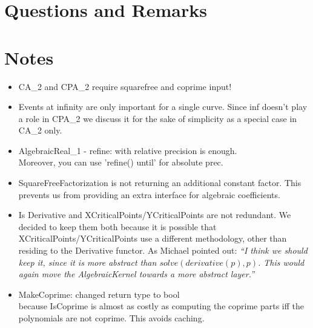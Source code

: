 
\section{Questions and Remarks}

\section{Notes}
\begin{itemize}
 \item CA\_2 and CPA\_2 require squarefree and coprime input! 
 \item Events at infinity are only important for a single curve. Since
   inf doesn't play a role in CPA\_2 we discuss it for the sake of
   simplicity as a special case in CA\_2 only. 
\item AlgebraicReal\_1 - refine: with relative precision is enough. \\
      Moreover, you can use 'refine() until' for absolute prec.
\item SquareFreeFactorization is not returning an additional constant 
      factor. This prevents us from providing an extra interface for 
      algebraic coefficients.
\item Is Derivative and XCriticalPoints/YCriticalPoints are not
   redundant. We decided to keep them both because it is possible that
   XCriticalPoints/YCriticalPoints use a different methodology, other
   than residing to the Derivative functor. As Michael pointed out:
   \emph{``I think we should keep it, since it is more abstract than
     $solve(derivative(p),p)$.  This would again move the {\em
       AlgebraicKernel} towards a more abstract layer.''}
\item MakeCoprime: changed return type to bool\\
      because IsCoprime is almost as costly as computing the coprime
      parts iff the polynomials are not coprime. This avoids caching.  
\end{itemize}

